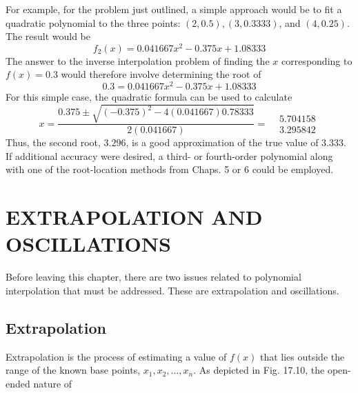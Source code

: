 \documentclass[../main.tex]{subfiles}
\begin{document}
    For example, for the problem just outlined, a simple approach would be to fit a quadratic polynomial to the three points: $(2,0.5),(3,0.3333)$, and $(4,0.25)$. The result would be
    $$
    f_{2}(x)=0.041667 x^{2}-0.375 x+1.08333
    $$
    The answer to the inverse interpolation problem of finding the $x$ corresponding to $f(x)=0.3$ would therefore involve determining the root of
    $$
    0.3=0.041667 x^{2}-0.375 x+1.08333
    $$
    For this simple case, the quadratic formula can be used to calculate
    $$
    x=\frac{0.375 \pm \sqrt{(-0.375)^{2}-4(0.041667) 0.78333}}{2(0.041667)}=\begin{aligned}
    &5.704158 \\
    &3.295842
    \end{aligned}
    $$
    Thus, the second root, $3.296$, is a good approximation of the true value of $3.333$. If additional accuracy were desired, a third- or fourth-order polynomial along with one of the root-location methods from Chaps. 5 or 6 could be employed.

    \section{EXTRAPOLATION AND OSCILLATIONS}
    Before leaving this chapter, there are two issues related to polynomial interpolation that
    must be addressed. These are extrapolation and oscillations.
    \subsection{Extrapolation}
    Extrapolation is the process of estimating a value of $f(x)$ that lies outside the range of the known base points, $x_{1}, x_{2}, \ldots, x_{n}$. As depicted in Fig. 17.10, the open-ended nature of
\end{document}
